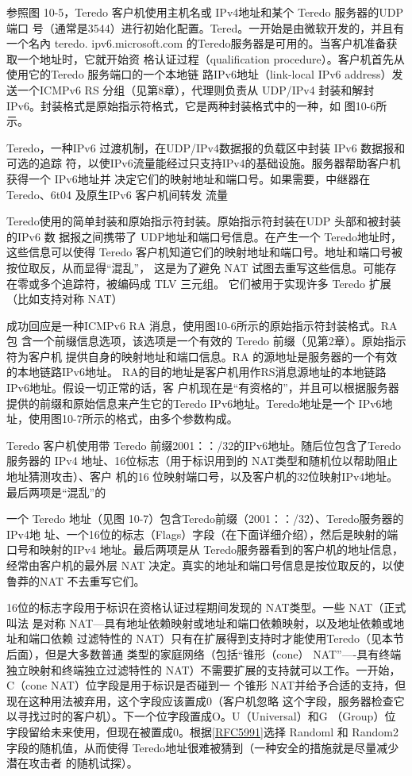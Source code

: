 参照图 10-5，Teredo 客户机使用主机名或 IPv4地址和某个 Teredo 服务器的UDP 端口
号（通常是3544）进行初始化配置。Tered。一开始是由微软开发的，并且有一个名內 teredo.
ipv6.microsoft.com 的Teredo服务器是可用的。当客户机准备获取一个地址时，它就开始资
格认证过程（qualification procedure）。客户机首先从使用它的Teredo 服务端口的一个本地链
路IPv6地址（link-local IPv6 address）发送一个ICMPv6 RS 分组（见第8章），代理则负责从
UDP/IPv4 封装和解封IPv6。封装格式是原始指示符格式，它是两种封装格式中的一种，如
图10-6所示。

Teredo，一种IPv6 过渡机制，在UDP/IPv4数据报的负载区中封装 IPv6 数据报和可选的追踪
符，以使IPv6流量能经过只支持IPv4的基础设施。服务器帮助客户机获得一个 IPv6地址并
决定它们的映射地址和端口号。如果需要，中继器在 Teredo、6t04 及原生IPv6 客户机间转发
流量

Teredo使用的简单封装和原始指示符封装。原始指示符封装在UDP 头部和被封装的IPv6 数
据报之间携带了 UDP地址和端口号信息。在产生一个 Teredo地址时，这些信息可以使得
Teredo 客户机知道它们的映射地址和端口号。地址和端口号被按位取反，从而显得“混乱”，
这是为了避免 NAT 试图去重写这些信息。可能存在零或多个追踪符，被编码成 TLV 三元组。
它们被用于实现许多 Teredo 扩展（比如支持对称 NAT）

成功回应是一种ICMPv6 RA 消息，使用图10-6所示的原始指示符封装格式。RA 包
含一个前缀信息选项，该选项是一个有效的 Teredo 前缀（见第2章）。原始指示符为客户机
提供自身的映射地址和端口信息。RA 的源地址是服务器的一个有效的本地链路IPv6地址。
RA的目的地址是客户机用作RS消息源地址的本地链路IPv6地址。假设一切正常的话，客
户机现在是“有资格的”，并且可以根据服务器提供的前缀和原始信息来产生它的Teredo
IPv6地址。Teredo地址是一个 IPv6地址，使用图10-7所示的格式，由多个参数构成。

Teredo 客户机使用带 Teredo 前缀2001：：/32的IPv6地址。随后位包含了Teredo服务器的
IPv4 地址、16位标志（用于标识用到的 NAT类型和随机位以帮助阻止地址猜测攻击）、客户
机的16 位映射端口号，以及客户机的32位映射IPv4地址。最后两项是“混乱”的

一个 Teredo 地址（见图 10-7）包含Teredo前缀（2001：：/32）、Teredo服务器的IPv4地
址、一个16位的标志（Flags）字段（在下面详细介绍），然后是映射的端口号和映射的IPv4
地址。最后两项是从 Teredo服务器看到的客户机的地址信息，经常由客户机的最外层 NAT
决定。真实的地址和端口号信息是按位取反的，以使鲁莽的NAT 不去重写它们。

16位的标志字段用于标识在资格认证过程期间发现的 NAT类型。一些 NAT（正式叫法
是对称 NAT—具有地址依赖映射或地址和端口依赖映射，以及地址依赖或地址和端口依赖
过滤特性的 NAT）只有在扩展得到支持时才能使用Teredo（见本节后面），但是大多数普通
类型的家庭网络（包括“锥形（cone） NAT”—-具有终端独立映射和终端独立过滤特性的
NAT）不需要扩展的支持就可以工作。一开始，C（cone NAT）位字段是用于标识是否碰到一
个锥形 NAT并给予合适的支持，但现在这种用法被弃用，这个字段应该置成0（客户机忽略
这个字段，服务器检查它以寻找过时的客户机）。下一个位字段置成O。U（Universal）和G
（Group）位字段留给未来使用，但现在被置成0。根据\href{https://www.rfc-editor.org/rfc/rfc5991}{[RFC5991]}选择
Randoml 和 Random2
字段的随机值，从而使得 Teredo地址很难被猜到（一种安全的措施就是尽量减少潜在攻击者
的随机试探）。

